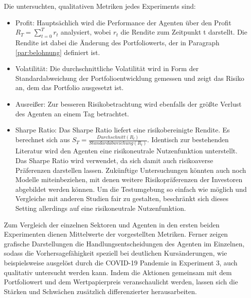 Die untersuchten, qualitativen Metriken jedes Experiments sind:
\begin{itemize}
\item Profit: Hauptsächlich wird die Performance der Agenten über den Profit $R_T=\sum_{t=0}^Tr_t$ analysiert, wobei $r_t$ die Rendite zum Zeitpunkt t darstellt.
Die Rendite ist dabei die Änderung des Portfoliowerts, der in Paragraph \ref{par:belohnung} definiert ist. 
\item Volatilität: Die durchschnittliche Volatilität wird in Form der Standardabweichung der Portfolioentwicklung gemessen und zeigt das Risiko an, dem das Portfolio ausgesetzt ist.  
\item Ausreißer: Zur besseren Risikobetrachtung wird ebenfalls der größte Verlust des Agenten an einem Tag betrachtet.
\item Sharpe Ratio: Das Sharpe Ratio \parencite{moodysaffell} liefert eine risikobereinigte Rendite. Es berechnet sich aus $S_T=\frac{Durchschnitt(R_t)}{Standardabweichung(R_t)}$.
Identisch zur bestehenden Literatur \parencites{zhang2019deep,théate2020application,deepQtrader} wird den Agenten eine risikoneutrale Nutzenfunktion unterstellt. Das Sharpe Ratio wird verwendet, da sich damit auch risikoaverse Präferenzen darstellen lassen. Zukünftige Untersuchungen könnten auch noch Modelle miteinbeziehen, mit denen weitere Risikopräferenzen der Investoren abgebildet werden können. Um die Testumgebung so einfach wie möglich und Vergleiche mit anderen Studien fair zu gestalten, beschränkt sich dieses Setting allerdings auf eine risikoneutrale Nutzenfunktion.
\end{itemize}

Zum Vergleich der einzelnen Sektoren und Agenten in den ersten beiden Experimenten dienen Mittelwerte der vorgestellten Metriken. 
Ferner zeigen grafische Darstellungen die Handlungsentscheidungen des Agenten im Einzelnen, sodass die Vorhersagefähigkeit speziell bei deutlichen Kursänderungen, wie beispielsweise ausgelöst durch die COVID-19 Pandemie in Experiment 3, auch qualitativ untersucht werden kann. Indem die Aktionen gemeinsam mit dem Portfoliowert und dem Wertpapierpreis veranschaulicht werden, lassen sich die Stärken und Schwächen zusätzlich differenzierter herausarbeiten.







































